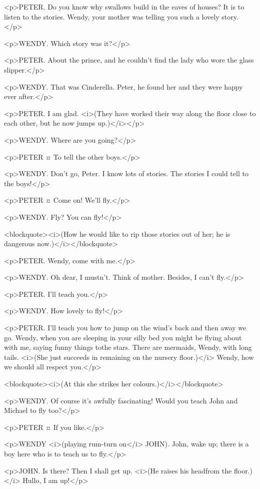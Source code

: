 <p>PETER. Do you know why swallows build in the eaves of houses? It is to listen to the stories. Wendy, your mother was telling you such a lovely story.</p>

<p>WENDY. Which story was it?</p>

<p>PETER. About the prince, and he couldn't find the lady who wore the glass slipper.</p>

<p>WENDY. That was Cinderella. Peter, he found her and they were happy ever after.</p>

<p>PETER. I am glad. <i>(They have worked their way along the floor close to each other, but he now jumps up.)</i></p>

<p>WENDY. Where are you going?</p>

<p>PETER ¤
To tell the other boys.</p>

<p>WENDY. Don't go, Peter. I know lots of stories. The stories I could tell to the boys!</p>

<p>PETER ¤
Come on! We'll fly.</p>

<p>WENDY. Fly? You can fly!</p>

<blockquote><i>(How he would like to rip those stories out of her; he is dangerous now.)</i></blockquote>

<p>PETER. Wendy, come with me.</p>

<p>WENDY. Oh dear, I mustn't. Think of mother. Besides, I can't fly.</p>

<p>PETER. I'll teach you.</p>

<p>WENDY. How lovely to fly!</p>

<p>PETER. I'll teach you how to jump on the wind's back and then away we go. Wendy, when you are sleeping in your silly bed you might be flying about with me, saying funny things tothe stars. There are mermaids, Wendy, with long tails. <i>(She just succeeds in remaining on the nursery floor.)</i> Wendy, how we should all respect you.</p>

<blockquote><i>(At this she strikes her colours.)</i></blockquote>

<p>WENDY. Of course it's awfully fascinating! Would you teach John and Michael to fly too?</p>

<p>PETER ¤
If you like.</p>

<p>WENDY <i>(playing rum-turn on</i> JOHN). John, wake up; there is a boy here who is to teach us to fly.</p>

<p>JOHN. Is there? Then I shall get up. <i>(He raises his headfrom the floor.)</i> Hullo, I am up!</p>

